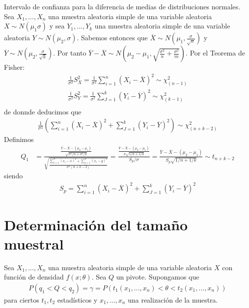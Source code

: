 \begin{ejemplo}
    Intervalo de confianza para la diferencia de medias de distribuciones normales.
    Sea $X_1,...,X_n$ una muestra aleatoria simple de una variable aleatoria $X \sim N(\mu_1\sigma)$ y sea $Y_1,...,Y_k$ una muestra aleatoria simple de una variable aleatoria $Y \sim N(\mu_2,\sigma)$. Sabemos entonces que $\overline{X} \sim N\left(\mu_1,\frac{\sigma}{\sqrt{n}} \right)$ y $\overline{Y} \sim N\left(\mu_2,\frac{\sigma}{\sqrt{k}} \right)$. Por tanto $\overline{Y} - \overline{X} \sim N\left(\mu_2 - \mu_1,\sqrt{\frac{\sigma^2}{n} + \frac{\sigma^2}{m}} \right)$. Por el Teorema de Fisher:
    \begin{align*}
        \frac{1}{\sigma^2}S^2_X = \frac{1}{\sigma^2} \sum_{i=1}^{n} (X_i - \overline{X})^2 \sim \chi_{(n-1)}^2 \\
        \frac{1}{\sigma^2}S^2_Y = \frac{1}{\sigma^2} \sum_{J=1}^{k} (Y_i - \overline{Y})^2 \sim \chi_{(k-1)}^2 \\
    \end{align*}
    de donnde deducimos que
    \begin{align*}
        \frac{1}{\sigma^2} \left(\sum_{i=1}^{n} (X_i - \overline{X})^2 +  \sum_{J=1}^{k} (Y_i - \overline{Y})^2\right) \sim \chi_{(n+k-2)}^2
    \end{align*}
    Definimos
    \begin{align*}
        Q_1 & = \frac{\frac{\overline{Y} - \overline{X} - (\mu_2 - \mu_1)}{\sqrt{\sigma^2/n + \sigma^2/k}}}{\sqrt{\frac{\sum_{i=1}^{n} (x_i - \overline{x})^2 + \sum_{j=1}^{k} (x_i - \overline{y})^2}{\sigma^2(n+k-2)}}} = \frac{\frac{\overline{Y} - \overline{X} - (\mu_2 -\mu_1)}{\sigma\sqrt{1/n + 1/k}}}{S_p/\sigma} = \frac{\overline{Y} - \overline{X} - (\mu_2 -\mu_1)}{S_p\sqrt{1/n + 1/k}} \sim t_{n+k-2}
    \end{align*}
    siendo
    \begin{align*}
        S_p = \sum_{i=1}^{n} (X_i - \overline{X})^2 +  \sum_{J=1}^{k} (Y_i - \overline{Y})^2
    \end{align*}
\end{ejemplo}

\section{Determinación del tamaño muestral}
Sea $X_1,...,X_n$ una muestra aleatoria simple de una variable aleatoria $X$ con función de densidad $f(x;\theta)$. Sea $Q$ un pivote. Supongamos que
\begin{align*}
    P(q_1 < Q < q_2) = \gamma = P(t_1(x_1,...,x_n) < \theta < t_2(x_1,...,x_n))
\end{align*}
para ciertos $t_1,t_2$ estadísticos y $x_1,...,x_n$ una realización de la muestra.

